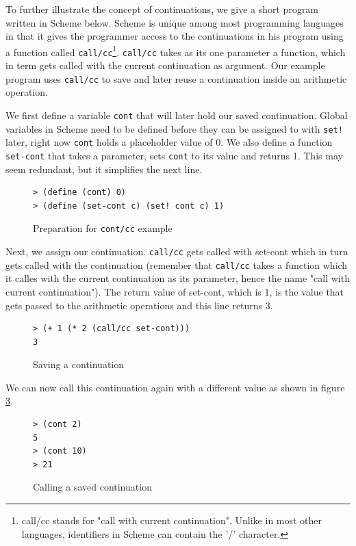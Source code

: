 \documentclass[11pt]{report}
\begin{document}
To further illustrate the concept of continuations, we give a short program written in Scheme below. Scheme is unique among most programming languages in that it gives the programmer access to the continuations in his program using a function called \texttt{call/cc}\footnote{call/cc stands for "call with current continuation". Unlike in most other languages, identifiers in Scheme can contain the '/' character.}. \texttt{call/cc} takes as its one parameter a function, which in term gets called with the current continuation as argument. Our example program uses \texttt{call/cc} to save and later reuse a continuation inside an arithmetic operation.

We first define a variable \texttt{cont} that will later hold our saved continuation. Global variables in Scheme need to be defined before they can be assigned to with \texttt{set!} later, right now \texttt{cont} holds a placeholder value of 0. We also define a function \texttt{set-cont} that takes a parameter, sets \texttt{cont} to its value and returns 1. This may seem redundant, but it simplifies the next line.
\begin{figure}[ht]
\begin{lstlisting}
> (define (cont) 0)
> (define (set-cont c) (set! cont c) 1)
\end{lstlisting}
\caption{Preparation for \texttt{cont/cc} example}
\label{contcc1}
\end{figure}

Next, we assign our continuation. \texttt{call/cc} gets called with set-cont which in turn gets called with the continuation (remember that \texttt{call/cc} takes a function which it calles with the current continuation as its parameter, hence the name "call with current continuation"). The return value of set-cont, which is 1, is the value that gets passed to the arithmetic operations and this line returns 3.
\begin{figure}[ht]
\begin{lstlisting}
> (+ 1 (* 2 (call/cc set-cont)))
3
\end{lstlisting}
\caption{Saving a continuation}
\label{contcc2}
\end{figure}

We can now call this continuation again with a different value as shown in figure \ref{contcc3}.
\begin{figure}[ht]
\begin{lstlisting}
> (cont 2)
5
> (cont 10)
> 21
\end{lstlisting}
\caption{Calling a saved continuation}
\label{contcc3}
\end{figure}
\end{document}
